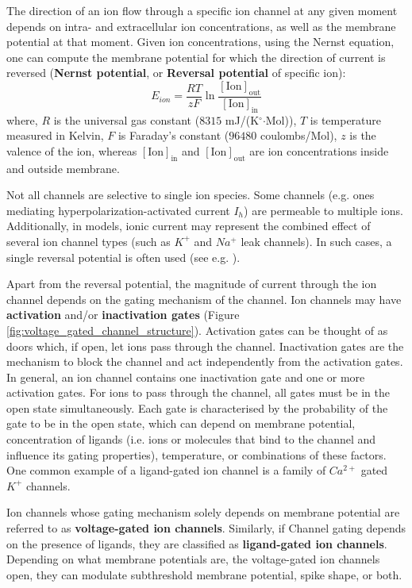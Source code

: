 \documentclass[../main.tex]{subfiles}
\begin{document}
The direction of an ion flow through a specific ion channel at any given moment depends on intra- and extracellular ion concentrations, as well as the membrane potential at that moment. Given ion concentrations, using the Nernst equation, one can compute the membrane potential for which the direction of current is reversed \cite{izhikevichDynamicalSystemsNeuroscience2006} (\textbf{Nernst potential}, or \textbf{Reversal potential} of specific ion):
\begin{equation}\label{eq:nernst_equation}
    E_{ion} = \frac{RT}{zF} \ln \frac{[\text{Ion}]_{\text{out}}}{[\text{Ion}]_{\text{in}}}
\end{equation}
where, $R$ is the universal gas constant ($8315$ mJ/(K$^\circ$$\cdot$Mol)), $T$ is temperature measured in Kelvin, $F$ is Faraday's constant ($96480$ coulombs/Mol), $z$ is the valence of the ion, whereas $[\text{Ion}]_{\text{in}}$ and $[\text{Ion}]_{\text{out}}$ are ion concentrations inside and outside membrane.

Not all channels are selective to single ion species. Some channels (e.g. ones mediating hyperpolarization-activated current $I_h$) are permeable to multiple ions. Additionally, in models, ionic current may represent the combined effect of several ion channel types (such as $K^+$ and $Na^+$ leak channels). In such cases, a single reversal potential is often used (see e.g. \cite{wangMultipleDynamicalModes1994}).

Apart from the reversal potential, the magnitude of current through the ion channel depends on the gating mechanism of the channel. Ion channels may have \textbf{activation} and/or \textbf{inactivation gates} (Figure \ref{fig:voltage_gated_channel_structure}). Activation gates can be thought of as doors which, if open, let ions pass through the channel. Inactivation gates are the mechanism to block the channel and act independently from the activation gates. In general, an ion channel contains one inactivation gate and one or more activation gates. For ions to pass through the channel, all gates must be in the open state simultaneously. Each gate is characterised by the probability of the gate to be in the open state, which can depend on membrane potential, concentration of ligands (i.e. ions or molecules that bind to the channel and influence its gating properties), temperature, or combinations of these factors. One common example of a ligand-gated ion channel is a family of $Ca^{2+}$ gated $K^+$ channels.

Ion channels whose gating mechanism solely depends on membrane potential are referred to as \textbf{voltage-gated ion channels}. Similarly, if Channel gating depends on the presence of ligands, they are classified as \textbf{ligand-gated ion channels}. Depending on what membrane potentials are, the voltage-gated ion channels open, they can modulate subthreshold membrane potential, spike shape, or both.
\end{document}
